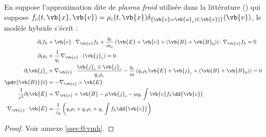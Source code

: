 \begin{pro}
  \label{pro:0:vmh}
  En suppose l'approximation dite de \emph{plasma froid} utilisée dans la littérature (\cite{Tronci:2014,Holderied:2019}) qui suppose $f_c(t,\vb{x},\vb{v}) = \rho_c(t,\vb{x})\delta_{\{\vb{v}=\vb{u}_c(t,\vb{x})\}}(\vb{v})$, le modèle hybride s'écrit :
  \begin{align}
    \label{eq:0:vmh:1}
      \partial_t f_h &+ \vb{v}\cdot\nabla_{\vb{x}} f_h + \frac{q_e}{m_e}\left( \vb{E} + \vb{v}\times(\vb{B}+\vb{B}_0) \right)\cdot\nabla_{\vb{v}} f_h = 0 \\
    \label{eq:0:vmh:2}
      \partial_t\rho_c &+ \frac{1}{q_e}\nabla_{\vb{x}}\cdot(\vb{j}_c) = 0 \\
    \label{eq:0:vmh:3}
      \partial_t\vb{j}_c &+ \nabla_{\vb{x}}\cdot\frac{\vb{j}_c\otimes\vb{j}_c}{q_e\rho_c} - \frac{q_e}{m}\left( q_e\rho_c\vb{E} + \vb{j}_c\times(\vb{B}+\vb{B}_0) \right) = 0 \\
    \label{eq:0:vmh:4}
      \pdv{\vb{B}}{t} &= - \nabla_{\vb{x}}\times\vb{E} \\
    \label{eq:0:vmh:5}
      \frac{1}{c^2}\partial_t\vb{E} &= \nabla_{\vb{x}}\times \vb{B} - \mu\vb{j}_c - \mu q_e\int \vb{v} f_h\dd{\vb{v}} \\
    \label{eq:0:vmh:6}
      \nabla_{\vb{x}}\cdot\vb{E} &= \frac{1}{\varepsilon_0}\left( q_i\rho_i + q_e\rho_c + q_e\int f_h\dd{\vb{v}} \right)
  \end{align}
\end{pro}
\begin{proof}
  Voir annexe \ref{ssec:0:vmh}.
\end{proof}

